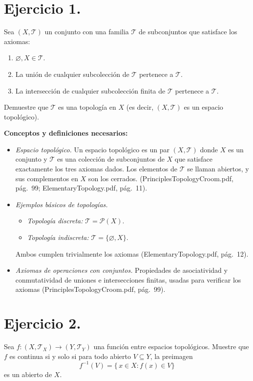 \documentclass[a4paper,11pt]{article}  %
\begin{document}
\bigskip

\section*{Ejercicio 1.} 
Sea \((X,\mathcal{T})\) un conjunto con una familia \(\mathcal{T}\) de subconjuntos que satisface los axiomas:
\begin{enumerate}
  \item \(\varnothing, X \in \mathcal{T}\).
  \item La unión de cualquier subcolección de \(\mathcal{T}\) pertenece a \(\mathcal{T}\).
  \item La intersección de cualquier subcolección finita de \(\mathcal{T}\) pertenece a \(\mathcal{T}\).
\end{enumerate}
Demuestre que \(\mathcal{T}\) es una topología en \(X\) (es decir, \((X,\mathcal{T})\) es un espacio topológico).

\medskip
\textbf{Conceptos y definiciones necesarios:}
\begin{itemize}
  \item \emph{Espacio topológico.} Un espacio topológico es un par \((X,\mathcal{T})\) donde \(X\) es un conjunto y \(\mathcal{T}\) es una colección de subconjuntos de \(X\) que satisface exactamente los tres axiomas dados. Los elementos de \(\mathcal{T}\) se llaman abiertos, y sus complementos en \(X\) son los cerrados.  
  (PrinciplesTopologyCroom.pdf, pág.\ 99; ElementaryTopology.pdf, pág.\ 11).
  \item \emph{Ejemplos básicos de topologías.}  
    \begin{itemize}
      \item \emph{Topología discreta:} \(\mathcal{T}= \mathcal{P}(X)\).  
      \item \emph{Topología indiscreta:} \(\mathcal{T}=\{\varnothing, X\}\).  
    \end{itemize}
    Ambos cumplen trivialmente los axiomas (ElementaryTopology.pdf, pág.\ 12).
  \item \emph{Axiomas de operaciones con conjuntos.}  
    Propiedades de asociatividad y conmutatividad de uniones e intersecciones finitas, usadas para verificar los axiomas (PrinciplesTopologyCroom.pdf, pág.\ 99).
\end{itemize}

\bigskip

\section*{Ejercicio 2.} 
Sea \(f\colon (X,\mathcal{T}_X)\to (Y,\mathcal{T}_Y)\) una función entre espacios topológicos. Muestre que \(f\) es continua si y solo si para todo abierto \(V\subseteq Y\), la preimagen
\[
f^{-1}(V)=\{\,x\in X : f(x)\in V\}
\]
es un abierto de \(X\).
\end{document}
